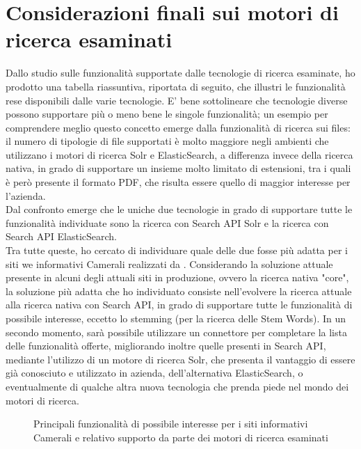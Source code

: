 	\section{Considerazioni finali sui motori di ricerca esaminati}
	Dallo studio sulle funzionalità supportate dalle tecnologie di ricerca esaminate, ho prodotto una tabella riassuntiva, riportata di seguito, che illustri le funzionalità rese disponibili dalle varie tecnologie. E' bene sottolineare che tecnologie diverse possono supportare più o meno bene le singole funzionalità; un esempio per comprendere meglio questo concetto emerge dalla funzionalità di ricerca sui files: il numero di tipologie di file supportati è molto maggiore negli ambienti che utilizzano i motori di ricerca \gls{Solr} e \gls{ElasticSearch}, a differenza invece della ricerca nativa, in grado di supportare un insieme molto limitato di estensioni, tra i quali è però presente il formato PDF, che risulta essere quello di maggior interesse per l'azienda. \\
	Dal confronto emerge che le uniche due tecnologie in grado di supportare tutte le funzionalità individuate sono la ricerca con Search API Solr e la ricerca con Search API ElasticSearch. \\
	Tra tutte queste, ho cercato di individuare quale delle due fosse più adatta per i siti we informativi Camerali realizzati da \nomeAzienda. Considerando la soluzione attuale presente in alcuni degli attuali siti in produzione, ovvero la ricerca nativa "core", la soluzione più adatta che ho individuato consiste nell'evolvere la ricerca attuale alla ricerca nativa con Search API, in grado di supportare tutte le funzionalità di possibile interesse, eccetto lo stemming (per la ricerca delle \gls{Stem Words}). In un secondo momento, sarà possibile utilizzare un connettore per completare la lista delle funzionalità offerte, migliorando inoltre quelle presenti in Search API, mediante l'utilizzo di un motore di ricerca \gls{Solr}, che presenta il vantaggio di essere già conosciuto e utilizzato in azienda, dell'alternativa \gls{ElasticSearch}, o eventualmente di qualche altra nuova tecnologia che prenda piede nel mondo dei motori di ricerca.
	
	\begin{figure}[p]
		\caption{Principali funzionalità di possibile interesse per i siti informativi Camerali e relativo supporto da parte dei motori di ricerca esaminati}
	\end{figure}